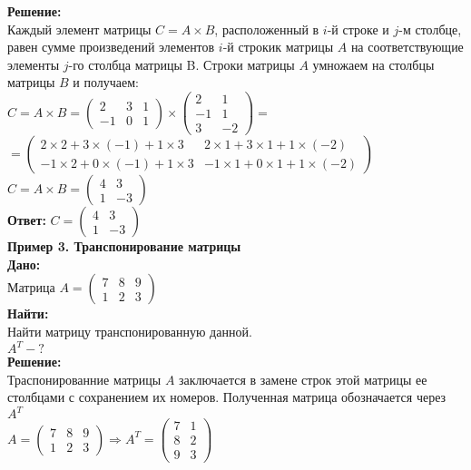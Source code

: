 \documentclass[a4paper,12pt]{article} %
\begin{document}
\textbf{Решение:}\\
Каждый элемент матрицы $C=A \times B$, расположенный в $i$-й строке и $j$-м столбце, равен сумме произведений элементов $i$-й строкик матрицы $A$ на соответствующие элементы $j$-го столбца матрицы B. Строки матрицы $A$ умножаем на столбцы матрицы $B$ и получаем:\\
$C=A \times B=\begin{pmatrix}
2&3&1\\
-1&0&1\end{pmatrix} \times \begin{pmatrix}
2&1\\
-1&1\\
3&-2\end{pmatrix}=$\\
$=\begin{pmatrix}
2 \times 2 + 3 \times (-1) + 1 \times 3 &2 \times 1 + 3 \times 1 + 1 \times (-2)\\
-1 \times 2 + 0 \times (-1) + 1 \times 3&-1 \times 1 + 0 \times 1 + 1 \times (-2)\end{pmatrix}$\\
$C=A \times B=\begin{pmatrix}
4&3\\
1&-3\end{pmatrix}$\\
\textbf{Ответ:} $C=\begin{pmatrix}
4&3\\
1&-3\end{pmatrix}$\\[2cm]
\large \textbf{Пример 3. Транспонирование матрицы}\\
\normalsize \textbf{Дано:}\\
Матрица $A=\begin{pmatrix}
7&8&9\\
1&2&3\end{pmatrix}$\\
\textbf{Найти:}\\
Найти матрицу транспонированную данной.\\
$A^T - ?$\\
\textbf{Решение:}\\
Траспонированние матрицы $A$ заключается в замене строк этой матрицы ее столбцами с сохранением их номеров. Полученная матрица обозначается через $A^T$\\
$A=\begin{pmatrix}
7&8&9\\
1&2&3\end{pmatrix}\Rightarrow A^T =\begin{pmatrix} 
7&1\\
8&2\\
9&3\end{pmatrix}$\\
\end{document}
